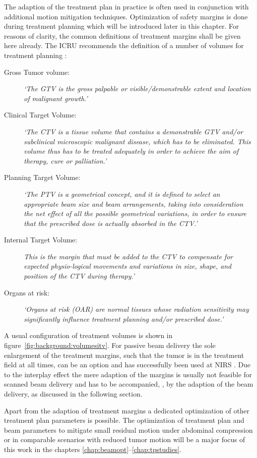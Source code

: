 The adaption of the treatment plan in practice is often used in
conjunction with additional motion mitigation techniques. Optimization
of safety margins is done during treatment planning which will be
introduced later in this chapter. For reasons of clarity, the common
definitions of treatment margins shall be given here already. The
\ac{ICRU} recommends the definition of a number of volumes for
treatment planning \citep{ICRU50,ICRU62}:
\begin{description}
\item[Gross Tumor volume:] \emph{\lq The \ac{GTV} is the gross
    palpable or visible/demonstrable extent and location of malignant
    growth.\rq}
\item[Clinical Target Volume:] \emph{\lq The \ac{CTV} is a tissue
    volume that contains a demonstrable \ac{GTV} and/or subclinical
    microscopic malignant disease, which has to be eliminated. This
    volume thus has to be treated adequately in order to achieve the
    aim of therapy, cure or palliation.\rq}
\item[Planning Target Volume:] \emph{\lq The \ac{PTV} is a geometrical
    concept, and it is defined to select an appropriate beam size and
    beam arrangements, taking into consideration the net effect of all
    the possible geometrical variations, in order to ensure that the
    prescribed dose is actually absorbed in the \ac{CTV}.\rq}
\item[Internal Target Volume:] \emph{This is the margin that must be
    added to the \ac{CTV} to compensate for expected physio-logical
    movements and variations in size, shape, and position of the
    \ac{CTV} during therapy.\rq}
\item[Organs at risk:] \emph{\lq Organs at risk (\acs{OAR}) are normal
    tissues whose radiation sensitivity may significantly influence
    treatment planning and/or prescribed dose.\rq}
\end{description}
A usual configuration of treatment volumes is shown in
figure~\ref{fig:background:volumesitv}. For passive beam delivery the
sole enlargement of the treatment margins, such that the tumor is in
the treatment field at all times, can be an option and has
successfully been used at \ac{NIRS} \citep{Nihei2006}. Due to the
interplay effect the mere adaption of the margins is usually not
feasible for scanned beam delivery and has to be accompanied, \eg, by
the adaption of the beam delivery, as discussed in the following
section.

Apart from the adaption of treatment margins a dedicated optimization
of other treatment plan parameters is possible. The optimization of
treatment plan and beam parameters to mitigate small residual motion
under abdominal compression or in comparable scenarios with reduced
tumor motion will be a major focus of this work in the chapters
\ref{chap:beamopt}--\ref{chap:tpstudies}.

